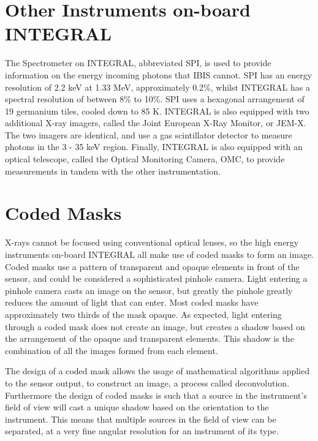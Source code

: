 \section{Other Instruments on-board INTEGRAL}
The Spectrometer on INTEGRAL, abbreviated SPI, is used to provide information on the energy incoming photons that IBIS cannot. SPI has an energy resolution of 2.2 keV at 1.33 MeV, approximately 0.2\%, whilst INTEGRAL has a spectral resolution of between 8\% to 10\%. SPI uses a hexagonal arrangement of 19 germanium tiles, cooled down to 85 K. 
INTEGRAL is also equipped with two additional X-ray imagers, called the Joint European X-Ray Monitor, or JEM-X. The two imagers are identical, and use a gas scintillator detector to measure photons in the 3 - 35 keV region. Finally, INTEGRAL is also equipped with an optical telescope, called the Optical Monitoring Camera, OMC, to provide measurements in tandem with the other instrumentation.

\section{Coded Masks}
X-rays cannot be focused using conventional optical lenses, so the high energy instruments on-board INTEGRAL all make use of coded masks to form an image. Coded masks use a pattern of transparent and opaque elements in front of the sensor, and could be considered a sophisticated pinhole camera. Light entering a pinhole camera casts an image on the sensor, but greatly the pinhole greatly reduces the amount of light that can enter. Most coded masks have approximately two thirds of the mask opaque. As expected, light entering through a coded mask does not create an image, but creates a shadow based on the arrangement of the opaque and transparent elements. This shadow is the combination of all the images formed from each element. 

The design of a coded mask allows the usage of mathematical algorithms applied to the sensor output, to construct an image, a process called deconvolution. Furthermore the design of coded masks is such that a source in the instrument's field of view will cast a unique shadow based on the orientation to the instrument. This means that multiple sources in the field of view can be separated, at a very fine angular resolution for an instrument of its type\cite{Goldwurm}.


